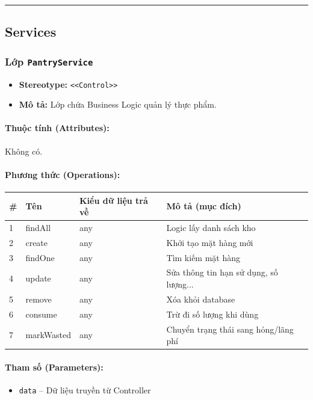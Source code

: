 \documentclass[12pt,a4paper]{article}
\begin{document}
\vskip 0.5cm
\noindent\rule{\textwidth}{0.5pt}
\vskip 0.5cm

\subsection{Services}

\subsubsection{Lớp \texttt{PantryService}}
\begin{itemize}[leftmargin=*]
    \item \textbf{Stereotype:} \texttt{\textless{}\textless{}Control\textgreater{}\textgreater{}}
    \item \textbf{Mô tả:} Lớp chứa Business Logic quản lý thực phẩm.
\end{itemize}

\paragraph{Thuộc tính (Attributes):}
Không có.

\paragraph{Phương thức (Operations):}
\begin{longtable}{|p{0.6cm}|p{3.8cm}|p{2.6cm}|p{6.5cm}|}
\hline
\textbf{\#} & \textbf{Tên} & \textbf{Kiểu dữ liệu trả về} & \textbf{Mô tả (mục đích)} \\ \hline
\endhead
1 & findAll & any & Logic lấy danh sách kho \\ \hline
2 & create & any & Khởi tạo mặt hàng mới \\ \hline
3 & findOne & any & Tìm kiếm mặt hàng \\ \hline
4 & update & any & Sửa thông tin hạn sử dụng, số lượng... \\ \hline
5 & remove & any & Xóa khỏi database \\ \hline
6 & consume & any & Trừ đi số lượng khi dùng \\ \hline
7 & markWasted & any & Chuyển trạng thái sang hỏng/lãng phí \\ \hline
\end{longtable}

\paragraph{Tham số (Parameters):}
\begin{itemize}[leftmargin=*]
    \item \texttt{data} – Dữ liệu truyền từ Controller
\end{itemize}
\end{document}
